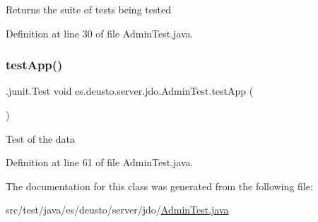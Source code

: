 \begin{DoxyReturn}{Returns}
the suite of tests being tested 
\end{DoxyReturn}


Definition at line 30 of file Admin\+Test.\+java.

\mbox{\label{classes_1_1deusto_1_1server_1_1jdo_1_1_admin_test_aba3d4e2c7110a3bc1c7557f4491e1691}} 
\subsubsection{\texorpdfstring{test\+App()}{testApp()}}
{\footnotesize\ttfamily .junit.\+Test void es.\+deusto.\+server.\+jdo.\+Admin\+Test.\+test\+App (\begin{DoxyParamCaption}{ }\end{DoxyParamCaption})}

Test of the data 

Definition at line 61 of file Admin\+Test.\+java.



The documentation for this class was generated from the following file\+:\begin{DoxyCompactItemize}
\item 
src/test/java/es/deusto/server/jdo/\hyperlink{_admin_test_8java}{Admin\+Test.\+java}\end{DoxyCompactItemize}
